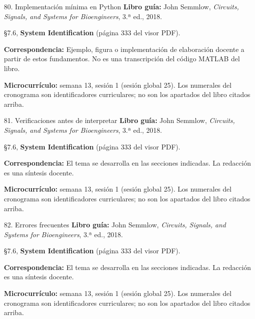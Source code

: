 \documentclass[
  10pt,
  ignorenonframetext,
  aspectratio=169,
  spanish,
]{beamer}
\begin{document}
\begin{frame}{80. Implementación mínima en Python}
\label{implementaciuxf3n-muxednima-en-python-4}
\textbf{Libro guía:} John Semmlow, \emph{Circuits, Signals, and Systems
for Bioengineers}, 3.ª ed., 2018.

§7.6, \textbf{System Identification} (página 333 del visor PDF).

\textbf{Correspondencia:} Ejemplo, figura o implementación de
elaboración docente a partir de estos fundamentos. No es una
transcripción del código MATLAB del libro.

\textbf{Microcurrículo:} semana 13, sesión 1 (sesión global 25). Los
numerales del cronograma son identificadores curriculares; no son los
apartados del libro citados arriba.
\end{frame}

\begin{frame}{81. Verificaciones antes de interpretar}
\label{verificaciones-antes-de-interpretar-4}
\textbf{Libro guía:} John Semmlow, \emph{Circuits, Signals, and Systems
for Bioengineers}, 3.ª ed., 2018.

§7.6, \textbf{System Identification} (página 333 del visor PDF).

\textbf{Correspondencia:} El tema se desarrolla en las secciones
indicadas. La redacción es una síntesis docente.

\textbf{Microcurrículo:} semana 13, sesión 1 (sesión global 25). Los
numerales del cronograma son identificadores curriculares; no son los
apartados del libro citados arriba.
\end{frame}

\begin{frame}{82. Errores frecuentes}
\label{errores-frecuentes-4}
\textbf{Libro guía:} John Semmlow, \emph{Circuits, Signals, and Systems
for Bioengineers}, 3.ª ed., 2018.

§7.6, \textbf{System Identification} (página 333 del visor PDF).

\textbf{Correspondencia:} El tema se desarrolla en las secciones
indicadas. La redacción es una síntesis docente.

\textbf{Microcurrículo:} semana 13, sesión 1 (sesión global 25). Los
numerales del cronograma son identificadores curriculares; no son los
apartados del libro citados arriba.
\end{frame}
\end{document}
